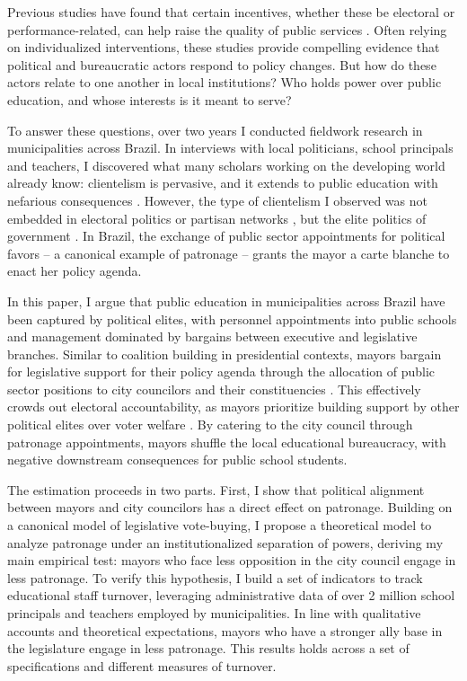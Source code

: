 Previous studies have found that certain incentives, whether these be electoral or performance-related, can help raise the quality of public services \citep{gulzar_politicians_2017,duflo_incentives_2012}. Often relying on individualized interventions, these studies provide compelling evidence that political and bureaucratic actors respond to policy changes.\citep{finan_personnel_2015} But how do these actors relate to one another in local institutions? Who holds power over public education, and whose interests is it meant to serve?

To answer these questions, over two years I conducted fieldwork research in municipalities across Brazil. In interviews with local politicians, school principals and teachers, I discovered what many scholars working on the developing world already know: clientelism is pervasive, and it extends to public education with nefarious consequences \citep{stokes_brokers_2013}. However, the type of clientelism I observed was not embedded in electoral politics \citep{oliveros_making_2016} or partisan networks \citep{akhtari_political_2015,colonnelli_patronage_2017}, but the elite politics of government \citep{raile_executive_2011}. In Brazil, the exchange of public sector appointments for political favors -- a canonical example of patronage -- grants the mayor a carte blanche to enact her policy agenda.

In this paper, I argue that public education in municipalities across Brazil have been captured by political elites, with personnel appointments into public schools and management dominated by bargains between executive and legislative branches. Similar to coalition building in presidential contexts, mayors bargain for legislative support for their policy agenda through the allocation of public sector positions to city councilors and their constituencies \citep{laver_coalitions_1990, power_optimism_2010}. This effectively crowds out electoral accountability, as mayors prioritize building support by other political elites over voter welfare \citep{ferejohn_incumbent_1986}. By catering to the city council through patronage appointments, mayors shuffle the local educational bureaucracy, with negative downstream consequences for public school students.

The estimation proceeds in two parts. First, I show that political alignment between mayors and city councilors has a direct effect on patronage. Building on a canonical model of legislative vote-buying, I propose a theoretical model to analyze patronage under an institutionalized separation of powers, deriving my main empirical test: mayors who face less opposition in the city council engage in less patronage. To verify this hypothesis, I build a set of indicators to track educational staff turnover, leveraging administrative data of over 2 million school principals and teachers employed by municipalities. In line with qualitative accounts and theoretical expectations, mayors who have a stronger ally base in the legislature engage in less patronage. This results holds across a set of specifications and different measures of turnover.

